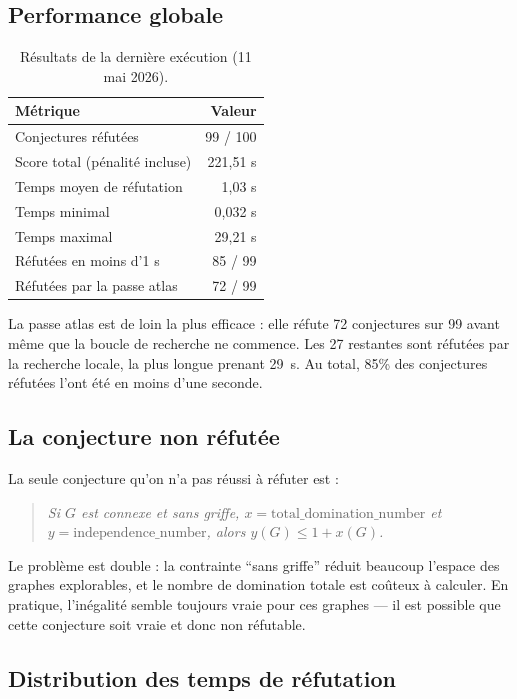 \documentclass[12pt,a4paper]{article}
\begin{document}
\subsection{Performance globale}

\begin{table}[h]
  \centering
  \begin{tabular}{lr}
    \toprule
    \textbf{Métrique} & \textbf{Valeur} \\
    \midrule
    Conjectures réfutées & 99 / 100 \\
    Score total (pénalité incluse) & 221,51 s \\
    Temps moyen de réfutation & 1,03 s \\
    Temps minimal & 0,032 s \\
    Temps maximal & 29,21 s \\
    Réfutées en moins d'1 s & 85 / 99 \\
    Réfutées par la passe atlas & 72 / 99 \\
    \bottomrule
  \end{tabular}
  \caption{Résultats de la dernière exécution (11 mai 2026).}
  \label{tab:results}
\end{table}

La passe atlas est de loin la plus efficace : elle réfute 72 conjectures sur 99
avant même que la boucle de recherche ne commence.  Les 27 restantes sont
réfutées par la recherche locale, la plus longue prenant 29~s.  Au total,
85\% des conjectures réfutées l'ont été en moins d'une seconde.

\subsection{La conjecture non réfutée}

La seule conjecture qu'on n'a pas réussi à réfuter est :

\begin{quote}
  \textit{Si $G$ est connexe et sans griffe, $x = \mathrm{total\_domination\_number}$
  et $y = \mathrm{independence\_number}$, alors $y(G) \leq 1 + x(G)$.}
\end{quote}

Le problème est double : la contrainte ``sans griffe'' réduit beaucoup l'espace
des graphes explorables, et le nombre de domination totale est coûteux à calculer.
En pratique, l'inégalité semble toujours vraie pour ces graphes — il est possible
que cette conjecture soit vraie et donc non réfutable.

\subsection{Distribution des temps de réfutation}
\end{document}

